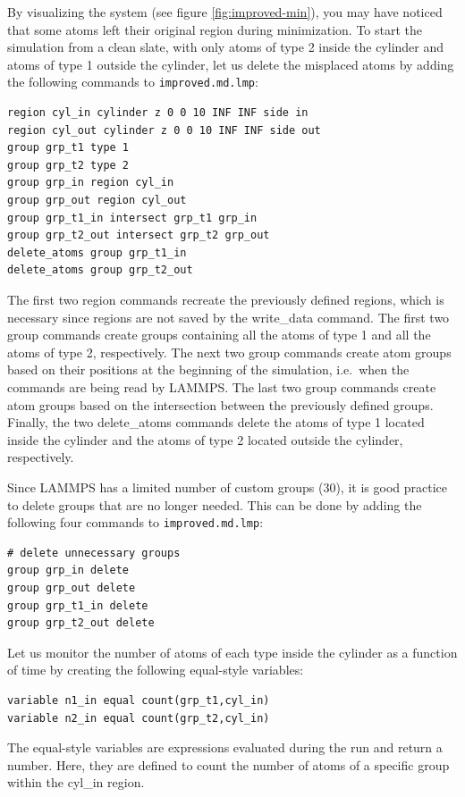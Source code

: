 \documentclass[9pt,tutorial]{livecoms}
\newcommand{\lmpcmd}[1]{\hspace{0pt}\colorbox{listing}{\textcolor{command}{\small{#1}}}\hspace{0pt}} %
\newcommand{\flecmd}[1]{\textcolor{command}{\texttt{#1}}} %
\begin{document}
By visualizing the system (see figure \ref{fig:improved-min}), you may
have noticed that some atoms left their original region during
minimization.  To start the simulation from a clean slate, with only
atoms of type 2 inside the cylinder and atoms of type 1 outside the
cylinder, let us delete the misplaced atoms by adding the following
commands to \flecmd{improved.md.lmp}:
\begin{lstlisting}
region cyl_in cylinder z 0 0 10 INF INF side in
region cyl_out cylinder z 0 0 10 INF INF side out
group grp_t1 type 1
group grp_t2 type 2
group grp_in region cyl_in
group grp_out region cyl_out
group grp_t1_in intersect grp_t1 grp_in
group grp_t2_out intersect grp_t2 grp_out
delete_atoms group grp_t1_in
delete_atoms group grp_t2_out
\end{lstlisting}
The first two \lmpcmd{region} commands recreate the previously defined
regions, which is necessary since regions are not saved by the
\lmpcmd{write\_data} command.  The first two \lmpcmd{group} commands
create groups containing all the atoms of type 1 and all the
atoms of type 2, respectively.  The next two \lmpcmd{group} commands
create atom groups based on their positions at the beginning of the
simulation, i.e.~when the commands are being read by LAMMPS.  The last
two \lmpcmd{group} commands create atom groups based on the intersection
between the previously defined groups.  Finally, the two
\lmpcmd{delete\_atoms} commands delete the atoms of type 1
located inside the cylinder and the atoms of type 2 located
outside the cylinder, respectively.

Since LAMMPS has a limited number of custom groups (30), it is good practice
to delete groups that are no longer needed.  This can be done by adding the
following four commands to \flecmd{improved.md.lmp}:
\begin{lstlisting}
# delete unnecessary groups
group grp_in delete
group grp_out delete
group grp_t1_in delete
group grp_t2_out delete
\end{lstlisting}

Let us monitor the number of atoms of each type inside the cylinder as a
function of time by creating the following equal-style variables:
\begin{lstlisting}
variable n1_in equal count(grp_t1,cyl_in)
variable n2_in equal count(grp_t2,cyl_in)
\end{lstlisting}
The equal-style \lmpcmd{variables} are expressions evaluated
during the run and return a number.  Here, they are defined to count
the number of atoms of a specific group within the \lmpcmd{cyl\_in} region.
\end{document}
